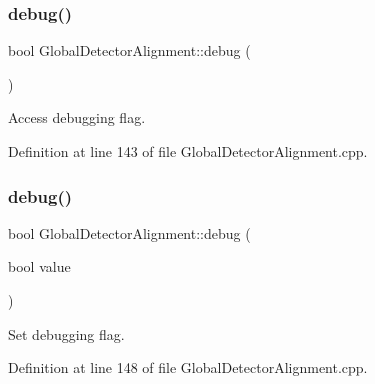 \subsubsection{\texorpdfstring{debug()}{debug()}\hspace{0.1cm}{\footnotesize\ttfamily [1/2]}}
{\footnotesize\ttfamily bool Global\+Detector\+Alignment\+::debug (\begin{DoxyParamCaption}{ }\end{DoxyParamCaption})\hspace{0.3cm}{\ttfamily [static]}}



Access debugging flag. 



Definition at line 143 of file Global\+Detector\+Alignment.\+cpp.

\hypertarget{class_d_d4hep_1_1_alignments_1_1_global_detector_alignment_af14b48c2d73add10f4b9dff410d6a5e0}{}\label{class_d_d4hep_1_1_alignments_1_1_global_detector_alignment_af14b48c2d73add10f4b9dff410d6a5e0} 
\subsubsection{\texorpdfstring{debug()}{debug()}\hspace{0.1cm}{\footnotesize\ttfamily [2/2]}}
{\footnotesize\ttfamily bool Global\+Detector\+Alignment\+::debug (\begin{DoxyParamCaption}\item[{bool}]{value }\end{DoxyParamCaption})\hspace{0.3cm}{\ttfamily [static]}}



Set debugging flag. 



Definition at line 148 of file Global\+Detector\+Alignment.\+cpp.

\hypertarget{class_d_d4hep_1_1_alignments_1_1_global_detector_alignment_aac0cf5fe586639599e736913cadf00c2}{}\label{class_d_d4hep_1_1_alignments_1_1_global_detector_alignment_aac0cf5fe586639599e736913cadf00c2} 
